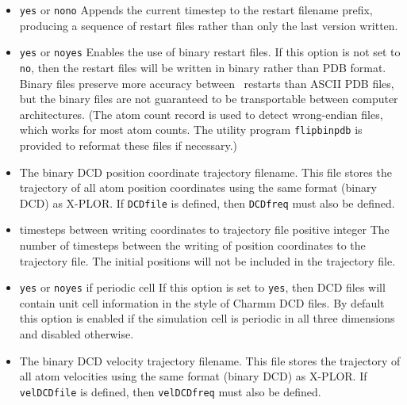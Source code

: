 \begin{itemize}
\item
{}
{{\tt yes} or {\tt no}}{{\tt no}}
{
Appends the current timestep to the restart filename prefix, producing
a sequence of restart files rather than only the last version written.
}

\item
{}
{{\tt yes} or {\tt no}}{{\tt yes}}
{
Enables the use of binary restart files.  
If this option is not set to {\tt no}, then the restart files 
will be written in binary rather than PDB format.  
Binary files preserve more accuracy between \NAMD\ restarts 
than ASCII PDB files, 
but the binary files are not guaranteed to be transportable 
between computer architectures. (The atom count record is used
to detect wrong-endian files, which works for most atom counts.
The utility program {\tt flipbinpdb} is provided
to reformat these files if necessary.)
}

\item
{}
{
The binary DCD position coordinate trajectory filename.  
This file stores the trajectory of all atom position coordinates 
using the same format (binary DCD) as X-PLOR.  
If {\tt DCDfile} is defined, then {\tt DCDfreq} must also be defined.  
}

\item
{}
{timesteps between writing coordinates to trajectory file}
{positive integer}
{
The number of timesteps between the writing of position coordinates 
to the trajectory file.  
The initial positions will not be included in the trajectory file.
}

\item
{}
{{\tt yes} or {\tt no}}{{\tt yes} if periodic cell}
{
If this option is set to {\tt yes}, then DCD files will contain unit
cell information in the style of Charmm DCD files.
By default this option is enabled if the simulation cell is periodic
in all three dimensions and disabled otherwise.
}

\item
{}
{
The binary DCD velocity trajectory filename.  
This file stores the trajectory of 
all atom velocities using the same format (binary DCD) as X-PLOR.  
If {\tt velDCDfile} is defined, then {\tt velDCDfreq} must also 
be defined.  
}


\end{itemize}
